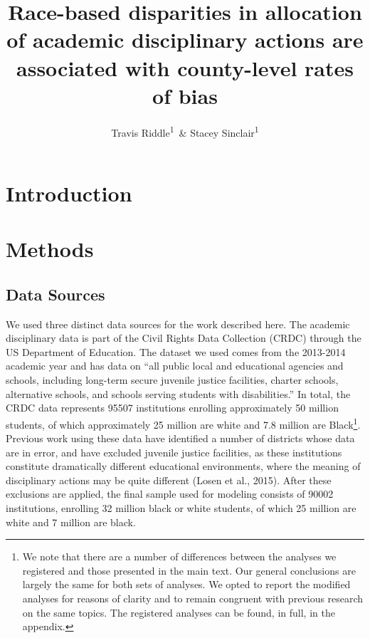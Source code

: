 \documentclass[english,floatsintext,man]{apa6}
\title{Race-based disparities in allocation of academic disciplinary actions
are associated with county-level rates of bias}
\author{Travis Riddle\textsuperscript{1}~\& Stacey Sinclair\textsuperscript{1}}
\affiliation{
    \vspace{0.5cm}
          \textsuperscript{1} Princeton University  }
\theoremstyle{definition}
\theoremstyle{definition}
\theoremstyle{remark}
\begin{document}
\maketitle

\setcounter{secnumdepth}{0}



\section{Introduction}\label{introduction}

\section{Methods}\label{methods}

\subsection{Data Sources}\label{data-sources}

We used three distinct data sources for the work described here. The
academic disciplinary data is part of the Civil Rights Data Collection
(CRDC) through the US Department of Education. The dataset we used comes
from the 2013-2014 academic year and has data on \enquote{all public
local and educational agencies and schools, including long-term secure
juvenile justice facilities, charter schools, alternative schools, and
schools serving students with disabilities.} In total, the CRDC data
represents 95507 institutions enrolling approximately 50 million
students, of which approximately 25 million are white and 7.8 million
are Black\footnote{We note that there are a number of differences
  between the analyses we registered and those presented in the main
  text. Our general conclusions are largely the same for both sets of
  analyses. We opted to report the modified analyses for reasons of
  clarity and to remain congruent with previous research on the same
  topics. The registered analyses can be found, in full, in the
  appendix.}. Previous work using these data have identified a number of
districts whose data are in error, and have excluded juvenile justice
facilities, as these institutions constitute dramatically different
educational environments, where the meaning of disciplinary actions may
be quite different (Losen et al., 2015). After these exclusions are
applied, the final sample used for modeling consists of 90002
institutions, enrolling 32 million black or white students, of which 25
million are white and 7 million are black.
\end{document}
